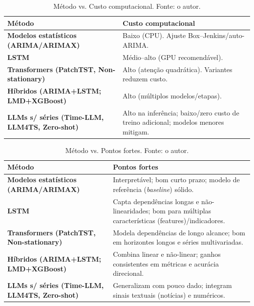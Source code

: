 \begin{table}[H]
  \centering
  \caption{Método vs. Custo computacional. Fonte: o autor.}
  \label{tab:metodo-custo}
  \scriptsize
  \setlength{\tabcolsep}{4pt}\renewcommand{\arraystretch}{1.15}
  \begin{tabularx}{\textwidth}{>{\bfseries}l Y}
    \toprule
    Método & Custo computacional \\
    \midrule
    Modelos estatísticos (ARIMA/ARIMAX) & Baixo (CPU). Ajuste Box--Jenkins/auto-ARIMA. \\
    LSTM & Médio--alto (GPU recomendável). \\
    Transformers (PatchTST, Non-stationary) & Alto (atenção quadrática). Variantes reduzem custo. \\
    Híbridos (ARIMA+LSTM; LMD+XGBoost) & Alto (múltiplos modelos/etapas). \\
    LLMs s/ séries (Time-LLM, LLM4TS, Zero-shot) & Alto na inferência; baixo/zero custo de treino adicional; modelos menores mitigam. \\
    \bottomrule
  \end{tabularx}
\end{table}

\begin{table}[H]
  \centering
  \caption{Método vs. Pontos fortes. Fonte: o autor.}
  \label{tab:metodo-fortes}
  \scriptsize
  \setlength{\tabcolsep}{4pt}\renewcommand{\arraystretch}{1.15}
  \begin{tabularx}{\textwidth}{>{\bfseries}l Y}
    \toprule
    Método & Pontos fortes \\
    \midrule
    Modelos estatísticos (ARIMA/ARIMAX) & Interpretável; bom curto prazo; modelo de referência (\textit{baseline}) sólido. \\
    LSTM & Capta dependências longas e não-linearidades; bom para múltiplas características (features)/indicadores. \\
    Transformers (PatchTST, Non-stationary) & Modela dependências de longo alcance; bom em horizontes longos e séries multivariadas. \\
    Híbridos (ARIMA+LSTM; LMD+XGBoost) & Combina linear e não-linear; ganhos consistentes em métricas e acurácia direcional. \\
    LLMs s/ séries (Time-LLM, LLM4TS, Zero-shot) & Generalizam com pouco dado; integram sinais textuais (notícias) e numéricos. \\
    \bottomrule
  \end{tabularx}
\end{table}



